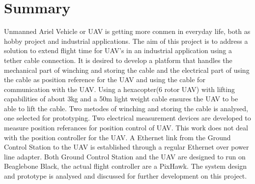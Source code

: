 \chapter{Summary}
Unmanned Ariel Vehicle or UAV is getting more conmen in everyday life, both as hobby project and industrial applications. The aim of this project is to address a solution to extend flight time for UAV's in an industrial application using a tether cable connection. It is desired to develop a platform that handles the mechanical part of winching and storing the cable and the electrical part of using the cable as position reference for the UAV and using the cable for communication with the UAV.
Using a hexacopter(6 rotor UAV) with lifting capabilities of about 3kg and a 50m light weight cable ensures the UAV to be able to lift the cable.
Two metodes of winching and storing the cable is analysed, one selected for prototyping.
Two electrical measurement devices are developed to measure position referances for position control of UAV. This work does not deal with the position controller for the UAV.
A Ethernet link from the Ground Control Station to the UAV is established through a regular Ethernet over power line adapter.
Both Ground Control Station and the UAV are designed to run on Beaglebone Black, the actual flight controller are a PixHawk.
The system design and prototype is analysed and discussed for further development on this project.


